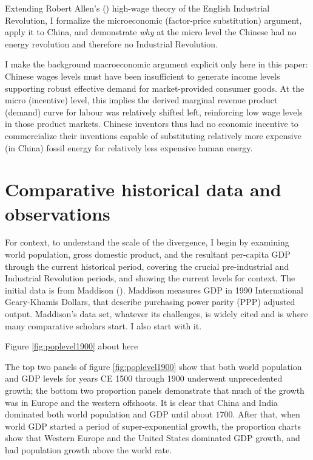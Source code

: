 \documentclass[12pt]{article}
\numberwithin{equation}{section}
\begin{document}
	Extending Robert Allen's (\citeyear{allen_british_2009}) high-wage theory of the English Industrial Revolution, I formalize the microeconomic (factor-price substitution) argument, apply it to China, and demonstrate \textit{why} at the micro level the Chinese had no energy revolution and therefore no Industrial Revolution. 
	
	I make the background macroeconomic argument explicit only here in this paper: Chinese wages levels must have been insufficient to generate income levels supporting robust effective demand for market-provided consumer goods. At the micro (incentive) level, this implies the derived marginal revenue product (demand) curve for labour was relatively shifted left, reinforcing low wage levels in those product markets. Chinese inventors thus had no economic incentive to commercialize their inventions capable of substituting relatively more expensive (in China) fossil energy for relatively less expensive human energy.
	
	\section*{Comparative historical data and observations}
	
		For context, to understand the scale of the divergence, I begin by examining world population, gross domestic product, and the resultant per-capita GDP through the current historical period, covering the crucial pre-industrial and Industrial Revolution periods, and showing the current levels for context. The initial data is from Maddison (\citeyear{maddison_maddison_2010}). Maddison measures GDP in 1990 International Geary-Khamis Dollars, that describe purchasing power parity (PPP) adjusted output. Maddison's data set, whatever its challenges, is widely cited and is where many comparative scholars start. I also start with it. 

\begin{center}		
Figure \ref{fig:poplevel1900} about here		
\end{center}
 				
		The top two panels of figure \ref{fig:poplevel1900} show that both world population and GDP levels for years CE 1500 through 1900 underwent unprecedented growth; the bottom two proportion panels demonstrate that much of the growth was in Europe and the western offshoots. It is clear that China and India dominated both world population and GDP until about $1700$. After that, when world GDP started a period of super-exponential growth, the proportion charts show that Western Europe and the United States dominated GDP growth, and had population growth above the world rate.
		
\end{document}
